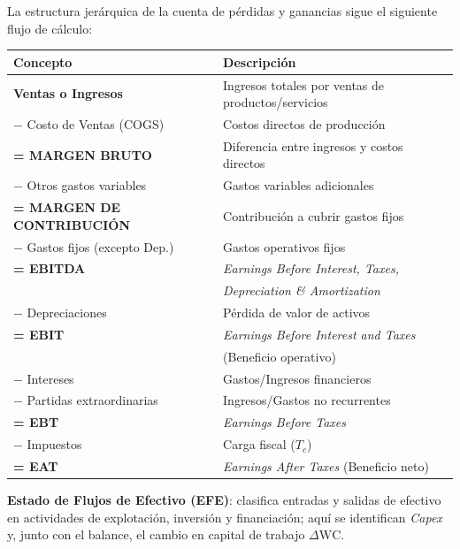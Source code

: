 La estructura jerárquica de la cuenta de pérdidas y ganancias sigue el siguiente flujo de cálculo:

\vspace{0.3cm}
\begin{center}
\begin{tabular}{lp{8cm}}
\toprule
\textbf{Concepto} & \textbf{Descripción} \\
\midrule
\textbf{Ventas o Ingresos} & Ingresos totales por ventas de productos/servicios \\
\quad $-$ Costo de Ventas (COGS) & Costos directos de producción \\
\midrule
\textbf{= MARGEN BRUTO} & Diferencia entre ingresos y costos directos \\
\quad $-$ Otros gastos variables & Gastos variables adicionales \\
\midrule
\textbf{= MARGEN DE CONTRIBUCIÓN} & Contribución a cubrir gastos fijos \\
\quad $-$ Gastos fijos (excepto Dep.) & Gastos operativos fijos \\
\midrule
\textbf{= EBITDA} & \textit{Earnings Before Interest, Taxes,} \\
& \textit{Depreciation \& Amortization} \\
\quad $-$ Depreciaciones & Pérdida de valor de activos \\
\midrule
\textbf{= EBIT} & \textit{Earnings Before Interest and Taxes} \\
& (Beneficio operativo) \\
\quad $-$ Intereses & Gastos/Ingresos financieros \\
\quad $-$ Partidas extraordinarias & Ingresos/Gastos no recurrentes \\
\midrule
\textbf{= EBT} & \textit{Earnings Before Taxes} \\
\quad $-$ Impuestos & Carga fiscal ($T_c$) \\
\midrule
\textbf{= EAT} & \textit{Earnings After Taxes} (Beneficio neto) \\
\bottomrule
\end{tabular}
\end{center}

\textbf{Estado de Flujos de Efectivo (EFE)}: clasifica entradas y salidas de efectivo en actividades de explotación, inversión y financiación; aquí se identifican \textit{Capex} y, junto con el balance, el cambio en capital de trabajo $\Delta \text{WC}$.

